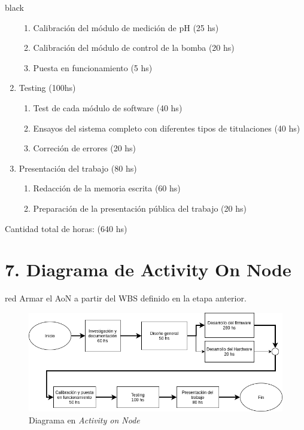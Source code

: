 \documentclass[11pt]{charter}
\begin{document}
\begin{consigna}{black}
\begin{enumerate}
	\begin{enumerate}	
	\item Calibración del módulo de medición de pH (25 hs)
	\item Calibración del módulo de control de la bomba (20 hs)
	\item Puesta en funcionamiento  (5 hs)
	\end{enumerate}
\item Testing (100hs)
	\begin{enumerate}	
	\item Test de cada módulo de software (40 hs)
	\item Ensayos del sistema completo con diferentes tipos de titulaciones (40 hs)
	\item Correción de errores (20 hs)
	\end{enumerate}
\item Presentación del trabajo (80 hs)
	\begin{enumerate}
	\item Redacción de la memoria escrita (60 hs)
	\item Preparación de la presentación pública del trabajo (20 hs)	
	\end{enumerate}
\end{enumerate}

Cantidad total de horas: (640 hs)

\end{consigna}

\section{7. Diagrama de Activity On Node}
\label{sec:AoN}

\begin{consigna}{red}
Armar el AoN a partir del WBS definido en la etapa anterior. 



\end{consigna}

\begin{figure}[htpb]
\centering 
\includegraphics[width=.8\textwidth]{./Figuras/AoN.png}
\caption{Diagrama en \textit{Activity on Node}}
\label{fig:AoN}
\end{figure}
\end{document}
